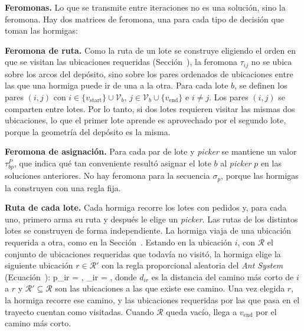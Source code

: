 {\bf Feromonas.} Lo que se transmite entre iteraciones no es una solución,
sino la feromona. Hay dos matrices de feromona, una para cada tipo de
decisión que toman las hormigas:
\startitemize[n]
	\item {\bf Feromona de ruta.} Como la ruta de un lote se construye
	eligiendo el orden en que se visitan las ubicaciones requeridas
	(Sección~), la feromona $\tau_{ij}$ no se ubica sobre
	los arcos del depósito, sino sobre
	los pares ordenados de ubicaciones entre las que una hormiga puede ir de
	una a la otra. Para cada lote $b$, se
	definen los pares $(i, j)$ con
	$i \in \{v_{\text{start}}\} \cup \mathcal{V}_b$,
	$j \in \mathcal{V}_b \cup \{v_{\text{end}}\}$ e $i \neq j$.
	Los pares $(i, j)$ se comparten entre lotes. Por lo tanto, si dos lotes requieren visitar las mismas dos
	ubicaciones, lo que el primer lote aprende es aprovechado por el
	segundo lote, porque la geometría del depósito es la misma.
	\item {\bf Feromona de asignación.} Para cada par de lote y {\em picker}
	se mantiene un valor $\tau^{P}_{bp}$, que indica qué tan conveniente
	resultó asignar el lote $b$ al {\em picker} $p$ en las soluciones
	anteriores.
\stopitemize
No hay feromona para la secuencia $\sigma_p$, porque las hormigas la
construyen con una regla fija.

{\bf Ruta de cada lote.} Cada hormiga recorre los lotes con pedidos y, para
cada uno, primero arma su ruta y después le elige un {\em picker}. Las rutas
de los distintos lotes se construyen de forma independiente. La hormiga viaja
de una ubicación requerida a otra, como en la Sección~.
Estando en la ubicación $i$, con $\mathcal{R}$ el conjunto de ubicaciones
requeridas que todavía no visitó, la hormiga elige la siguiente ubicación
$r \in \mathcal{R}'$ con la regla proporcional aleatoria del {\em Ant System}
(Ecuación~):
\startplaceformula[reference=eq:aco_regla_ruta]
\startformula
	p_{ir} = ,
	\qquad \eta_{ir} = ,
\stopformula
\stopplaceformula
donde $d_{ir}$ es la distancia del camino más corto de $i$ a $r$ y
$\mathcal{R}' \subseteq \mathcal{R}$ son las ubicaciones a las que existe ese
camino. Una vez elegida $r$, la hormiga recorre ese camino, y las ubicaciones
requeridas por las que pasa en el trayecto cuentan como visitadas. Cuando
$\mathcal{R}$ queda vacío, llega a $v_{\text{end}}$ por el camino más corto.

